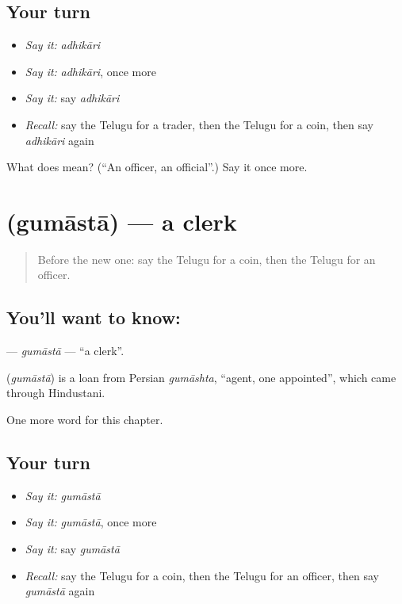\subsection*{Your turn}
\begin{itemize}
\raggedright
  \item \emph{Say it:} \emph{adhikāri}
  \item \emph{Say it:} \emph{adhikāri}, once more
  \item \emph{Say it:} say \emph{adhikāri}
  \item \emph{Recall:} say the Telugu for a trader, then the Telugu for a coin, then say \emph{adhikāri} again
\end{itemize}

\begin{tcolorbox}[breakable,colback=teal!4,colframe=teal!35!black,title={Before you move on}]
What does  mean? (\textquotedblleft{}An officer, an official\textquotedblright{}.) Say it once more.
\end{tcolorbox}
\section[\texorpdfstring{\te{గుమాస్తా} (gumāstā)}{గుమాస్తా (gumāstā)}]{ (gumāstā) — a clerk}

\label{lesson:TE-C195-gumasta}



\begin{quote}
Before the new one: say the Telugu for a coin, then the Telugu for an officer.
\end{quote}

\subsection*{You'll want to know: }
\textbf{} — \emph{gumāstā} — \textquotedblleft{}a clerk\textquotedblright{}.

\begin{cousinweb}
\textbf{} (\emph{gumāstā}) is a loan from Persian \emph{gumāshta}, \textquotedblleft{}agent, one appointed\textquotedblright{}, which came through Hindustani.
\end{cousinweb}

\begin{grammarlens}[title={What you've built}]
One more word for this chapter.
\end{grammarlens}

\subsection*{Your turn}
\begin{itemize}
\raggedright
  \item \emph{Say it:} \emph{gumāstā}
  \item \emph{Say it:} \emph{gumāstā}, once more
  \item \emph{Say it:} say \emph{gumāstā}
  \item \emph{Recall:} say the Telugu for a coin, then the Telugu for an officer, then say \emph{gumāstā} again
\end{itemize}

